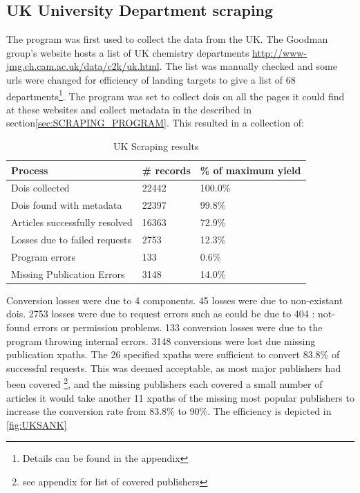 \subsection{UK University Department scraping}
\label{sec:UKSCRAPE}
The program was first used to collect the data from the UK. The Goodman group's website hosts a list of UK chemistry departments \url{http://www-jmg.ch.cam.ac.uk/data/c2k/uk.html}. The list was manually checked and some urls were changed for efficiency of landing targets to give a list of 68 departments\footnote{Details can be found in the appendix}. The program was set to collect dois on all the pages it could find at these websites and collect metadata in the described in section\ref{sec:SCRAPING_PROGRAM}.
This resulted in a collection of:
\begin{table}[h!]
\label{tab:UKSCRAPERES}
\caption{UK Scraping results}
\begin{center}
\begin{tabular}{||l|l|l||}
\hline
Process & \# records & \% of maximum yield\\
\hline
Dois collected & 22442 & 100.0\%\\
Dois found with metadata & 22397 & 99.8\%\\
Articles successfully resolved & 16363 & 72.9\%\\
Losses due to failed requests & 2753 & 12.3\%\\
Program errors & 133 & 0.6\%\\
Missing Publication Errors & 3148 & 14.0\% \\
\hline
\end{tabular}
\end{center}
\end{table}
Conversion losses were due to 4 components. 45 losses were due to non-existant dois. 2753 losses were due to request errors such as could be due to 404 : not-found errors or permission problems. 
133 conversion losses were due to the program throwing internal errors.
3148 conversions were lost due missing publication xpaths. The 26 specified xpaths were sufficient to convert 83.8\% of successful requests. This was deemed acceptable, as most major publishers had been covered \footnote{see appendix for list of covered publishers}, and the missing publishers each covered a small number of articles it would take another 11 xpaths of the missing most popular publishers to increase the conversion rate from 83.8\% to 90\%.
The efficiency is depicted in \ref{fig:UKSANK}

